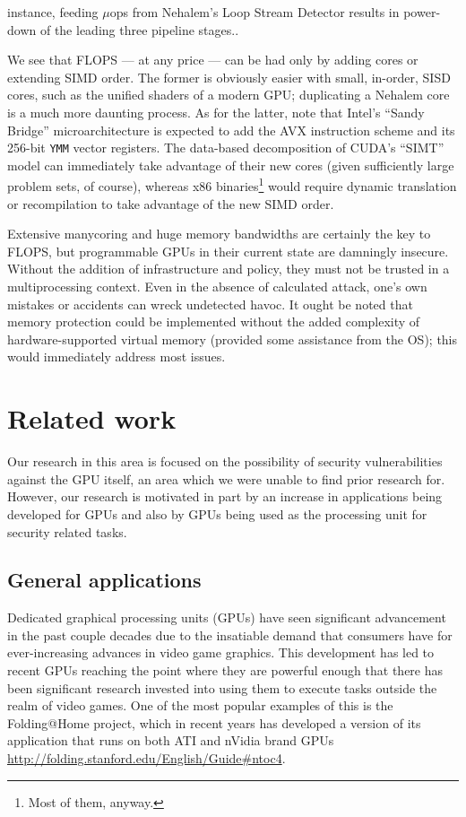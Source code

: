 \documentclass[letterpaper,10pt]{article}
\begin{document}
\begin{multicols}{2}
\begin{itemize}
{instance, feeding $\mu$ops from Nehalem's Loop Stream Detector results in power-down
of the leading three pipeline stages.}.
\end{itemize}
We see that FLOPS --- at any price --- can be had only by adding cores or extending
SIMD order. The former is obviously easier with small, in-order, SISD cores,
such as the unified shaders of a modern GPU\@; duplicating a Nehalem core is a
much more daunting process. As for the latter, note that Intel's ``Sandy
Bridge'' microarchitecture is expected to add the AVX instruction scheme and
its 256-bit \texttt{YMM} vector registers\cite{avx}\cite{fma4}. The data-based decomposition of CUDA's
``SIMT'' model can immediately take advantage of their new cores (given
sufficiently large problem sets, of course), whereas x86 binaries\footnote{Most of them, anyway.} would
require dynamic translation or recompilation to take advantage of the new SIMD
order.

Extensive manycoring and huge memory bandwidths are certainly the key to FLOPS,
but programmable GPUs in their current state are damningly insecure. Without the
addition of infrastructure and policy, they must not be trusted in a
multiprocessing context. Even in the absence of calculated attack, one's own
mistakes or accidents can wreck undetected havoc. It ought be noted that memory
protection could be implemented without the added complexity of
hardware-supported virtual memory (provided some assistance from the OS); this
would immediately address most issues.

\section{Related work}
Our research in this area is focused on the possibility of security
vulnerabilities against the GPU itself, an area which we were unable to find
prior research for. However, our research is motivated in part by an increase
in applications being developed for GPUs and also by GPUs being used as the
processing unit for security related tasks.
  
\subsection{General applications}
  
  Dedicated graphical processing units (GPUs) have seen significant advancement
in the past couple decades due to the insatiable demand that consumers have for
ever-increasing advances in video game graphics. This development has led to
recent GPUs reaching the point where they are powerful enough that there has
been significant research invested into using them to execute tasks outside the
realm of video games. One of the most popular examples of this is the
Folding@Home project, which in recent years has developed a version of its
application that runs on both ATI and nVidia brand GPUs
\url{http://folding.stanford.edu/English/Guide#ntoc4}.
  

\end{multicols}
\end{document}
